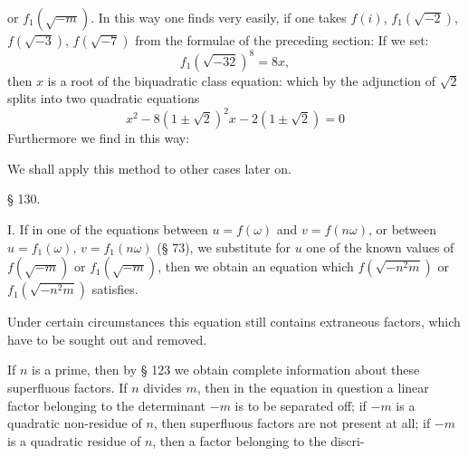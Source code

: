 or $f_1(\sqrt{-m})$. In this way one finds very easily, if one takes
$f(i)$, $f_1(\sqrt{-2})$, $f(\sqrt{-3})$, $f(\sqrt{-7})$ from the
formulae of the preceding section:
If we set:
\[
f_1(\sqrt{-32})^8 = 8x,
\]
then $x$ is a root of the biquadratic class equation:
which by the adjunction of $\sqrt2$ splits into two quadratic equations
\[
x^2-8(1\pm\sqrt2)^2x-2(1\pm\sqrt2)=0
\]
Furthermore we find in this way:

We shall apply this method to other cases later on.

§ 130.


I. If in one of the equations between $u=f(\omega)$
and $v=f(n\omega)$, or between $u=f_1(\omega)$, $v=f_1(n\omega)$ (§ 73),
we substitute for $u$ one of the known values of $f(\sqrt{-m})$ or $f_1(\sqrt{-m})$,
then we obtain an equation which $f(\sqrt{-n^2m})$
or $f_1(\sqrt{-n^2m})$ satisfies.

Under certain circumstances this equation still contains extraneous factors, which
have to be sought out and removed.

If $n$ is a prime, then by § 123 we obtain complete
information about these superfluous factors. If $n$ divides $m$,
then in the equation in question a linear factor belonging to the determinant $-m$
is to be separated off; if $-m$ is a quadratic non-residue
of $n$, then superfluous factors are not present at all;
if $-m$ is a quadratic residue of $n$, then a factor belonging to the discri-
